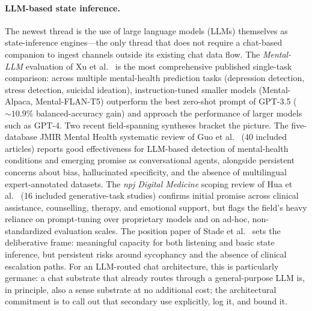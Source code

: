 \documentclass[11pt,a4paper]{article}
\begin{document}
\paragraph{LLM-based state inference.}
The newest thread is the use of large language models (LLMs)
themselves as state-inference engines---the only thread that does
not require a chat-based companion to ingest channels outside its
existing chat data flow. The \emph{Mental-LLM} evaluation of Xu et
al.~\cite{Xu2024MentalLLM} is the most comprehensive published
single-task comparison: across multiple mental-health prediction
tasks (depression detection, stress detection, suicidal ideation),
instruction-tuned smaller models (Mental-Alpaca, Mental-FLAN-T5)
outperform the best zero-shot prompt of GPT-3.5
($\sim\!10.9\%$ balanced-accuracy gain) and approach the
performance of larger models such as GPT-4. Two recent
field-spanning syntheses bracket the picture. The five-database
JMIR Mental Health systematic review of Guo et
al.~\cite{Guo2024LLMMHReview} (40 included articles) reports good
effectiveness for LLM-based detection of mental-health conditions
and emerging promise as conversational agents, alongside persistent
concerns about bias, hallucinated specificity, and the absence of
multilingual expert-annotated datasets. The \emph{npj Digital
Medicine} scoping review of Hua et
al.~\cite{Hua2025LLMScopingReview} (16 included generative-task
studies) confirms initial promise across clinical assistance,
counselling, therapy, and emotional support, but flags the field's
heavy reliance on prompt-tuning over proprietary models and on
ad-hoc, non-standardized evaluation scales. The position paper of
Stade et al.~\cite{Stade2024LLMOppRisks} sets the deliberative
frame: meaningful capacity for both listening and basic state
inference, but persistent risks around sycophancy and the absence
of clinical escalation paths. For an LLM-routed chat architecture,
this is particularly germane: a chat substrate that already routes
through a general-purpose LLM is, in principle, also a sense
substrate at no additional cost; the architectural commitment is
to call out that secondary use explicitly, log it, and bound it.
\end{document}

